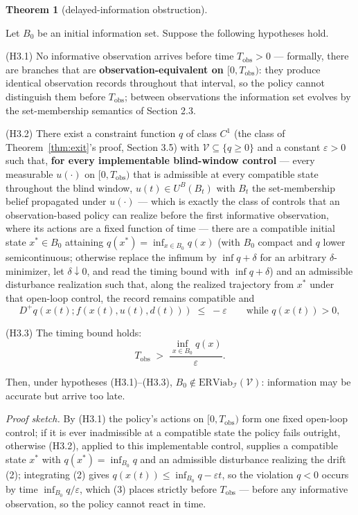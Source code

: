 \documentclass[10pt,twocolumn]{article}
\theoremstyle{definition}
\newtheorem{theorem}{Theorem}
\begin{document}
\begin{theorem}[delayed-information obstruction]\label{thm:delayed}

Let \(B_0\) be an initial information set. Suppose the following
hypotheses hold.

(H3.1) No informative observation arrives before time
\(T_{\mathrm{obs}} > 0\) --- formally, there are branches that are
\textbf{observation-equivalent on \([0, T_{\mathrm{obs}})\)}: they
produce identical observation records throughout that interval, so the
policy cannot distinguish them before \(T_{\mathrm{obs}}\); between
observations the information set evolves by the set-membership semantics
of Section 2.3.

(H3.2) There exist a constraint function \(q\) of class \(C^1\) (the class of Theorem~\ref{thm:exit}'s proof, Section 3.5) with \(\mathcal{V} \subseteq \{ q \ge 0 \}\)
and a constant \(\varepsilon > 0\) such that, \textbf{for every implementable blind-window control} --- every
measurable \(u(\cdot)\) on \([0, T_{\mathrm{obs}})\) that is admissible at
every compatible state throughout the blind window, \(u(t) \in U^B(B_t)\)
with \(B_t\) the set-membership belief propagated under \(u(\cdot)\) ---
which is exactly the class of controls that an observation-based policy
can realize before the first informative observation, where its actions
are a fixed function of time --- there are a compatible initial state \(x^* \in B_0\) attaining
\(q(x^*) = \inf_{x \in B_0} q(x)\) (with \(B_0\) compact and \(q\) lower
semicontinuous; otherwise replace the infimum by \(\inf q + \delta\) for
an arbitrary \(\delta\)-minimizer, let \(\delta \downarrow 0\), and read
the timing bound with \(\inf q + \delta\)) and an admissible disturbance
realization such that, along the realized trajectory from \(x^*\) under
that open-loop control, the record remains compatible and
\[D^+ q(x(t); f(x(t), u(t), d(t))) \;\le\; -\varepsilon \qquad \text{while } q(x(t)) > 0, \tag{2}\]

(H3.3) The timing bound holds:
\[T_{\mathrm{obs}} \;>\; \frac{\inf_{x \in B_0} q(x)}{\varepsilon}. \tag{3}\]

Then, under hypotheses (H3.1)--(H3.3),
\(B_0 \notin \mathrm{ERViab}_{\mathcal{I}}(\mathcal{V})\): information
may be accurate but arrive too late.

\end{theorem}

\emph{Proof sketch.} By (H3.1) the policy's actions on \([0, T_{\mathrm{obs}})\) form one fixed open-loop control; if it is ever inadmissible at a compatible state the policy fails outright, otherwise (H3.2), applied to this implementable control, supplies a compatible state \(x^*\) with \(q(x^*) = \inf_{B_0} q\) and an admissible disturbance realizing the drift (2); integrating (2) gives \(q(x(t)) \le \inf_{B_0} q - \varepsilon t\), so the violation \(q < 0\) occurs by time \(\inf_{B_0} q / \varepsilon\), which (3) places strictly before \(T_{\mathrm{obs}}\) --- before any informative observation, so the policy cannot react in time.
\end{document}
